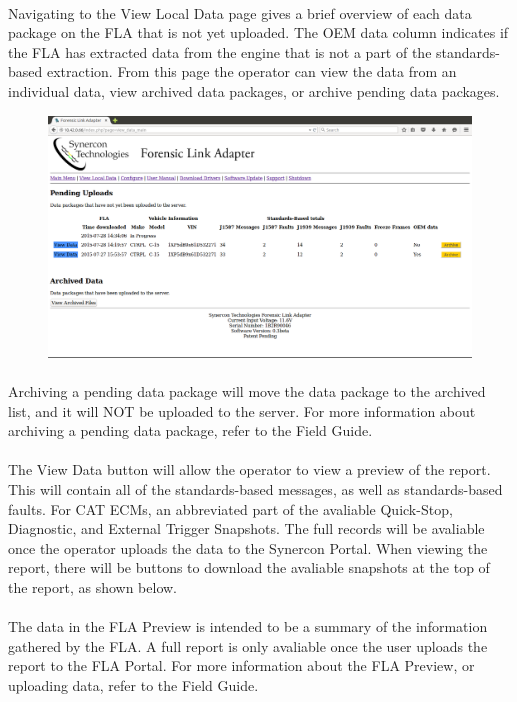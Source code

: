 \documentclass[11pt]{article}
\begin{document}
\paragraph{  }
Navigating to the View Local Data page gives a brief overview of each data package on the FLA that is not yet uploaded. The OEM data column indicates if the FLA has extracted data from the engine that is not a part of the standards-based extraction. From this page the operator can view the data from an individual data, view archived data packages, or archive pending data packages.
\begin{figure}[tbph]
\centering
\includegraphics[width=.95\linewidth]{../media/fla_preview_screenshots/local_data}
\label{fig:fla_preview_local_data}
\end{figure}
\paragraph{  }
Archiving a pending data package will move the data package to the archived list, and it will NOT be uploaded to the server. For more information about archiving a pending data package, refer to the Field Guide.
\paragraph{  }
The View Data button will allow the operator to view a preview of the report. This will contain all of the standards-based messages, as well as standards-based faults. For CAT ECMs, an abbreviated part of the avaliable Quick-Stop, Diagnostic, and External Trigger Snapshots. The full records will be avaliable once the operator uploads the data to the Synercon Portal. When viewing the report, there will be buttons to download the avaliable snapshots at the top of the report, as shown below.
\begin{figure}[tbph]
\centering
\end{figure}

\paragraph{  }
The data in the FLA Preview is intended to be a summary of the information gathered by the FLA. A full report is only avaliable once the user uploads the report to the FLA Portal. For more information about the FLA Preview, or uploading data, refer to the Field Guide.
\end{document}
